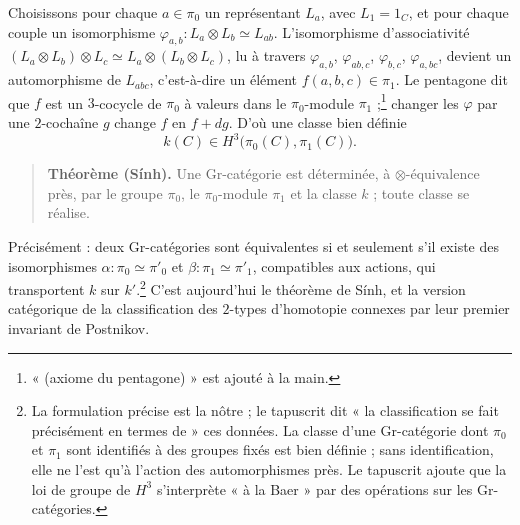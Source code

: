 \documentclass[11pt,a4paper]{article}
\begin{document}
Choisissons pour chaque $a \in \pi_0$ un représentant $L_a$, avec $L_1 = 1_C$,
et pour chaque couple un isomorphisme
$\varphi_{a,b} : L_a \otimes L_b \simeq L_{ab}$. L'isomorphisme d'associativité
$(L_a \otimes L_b) \otimes L_c \simeq L_a \otimes (L_b \otimes L_c)$, lu à
travers $\varphi_{a,b}$, $\varphi_{ab,c}$, $\varphi_{b,c}$, $\varphi_{a,bc}$,
devient un automorphisme de $L_{abc}$, c'est-à-dire un élément
$f(a,b,c) \in \pi_1$. Le pentagone dit que $f$ est un $3$-cocycle de $\pi_0$ à
valeurs dans le $\pi_0$-module $\pi_1$ ;\footnote{« (axiome du pentagone) »
est ajouté à la main.} changer les $\varphi$ par une $2$-cochaîne $g$ change
$f$ en $f + dg$. D'où une classe bien définie
\[ k(C) \in H^3\bigl(\pi_0(C), \pi_1(C)\bigr) . \]

\begin{quote}
\textbf{Théorème (Sính).} Une Gr-catégorie est déterminée, à
$\otimes$-équivalence près, par le groupe $\pi_0$, le $\pi_0$-module $\pi_1$
et la classe $k$ ; toute classe se réalise.
\end{quote}

Précisément : deux Gr-catégories sont équivalentes si et seulement s'il
existe des isomorphismes $\alpha : \pi_0 \simeq \pi'_0$ et
$\beta : \pi_1 \simeq \pi'_1$, compatibles aux actions, qui transportent $k$
sur $k'$.\footnote{La formulation précise est la nôtre ; le tapuscrit dit
« la classification se fait précisément en termes de » ces données. La
classe d'une Gr-catégorie dont $\pi_0$ et $\pi_1$ sont identifiés à des
groupes fixés est bien définie ; sans identification, elle ne l'est qu'à
l'action des automorphismes près. Le tapuscrit ajoute que la loi de groupe de
$H^3$ s'interprète « à la Baer » par des opérations sur les Gr-catégories.}
C'est aujourd'hui le théorème de Sính, et la version catégorique de la
classification des $2$-types d'homotopie connexes par leur premier invariant
de Postnikov.
\end{document}
